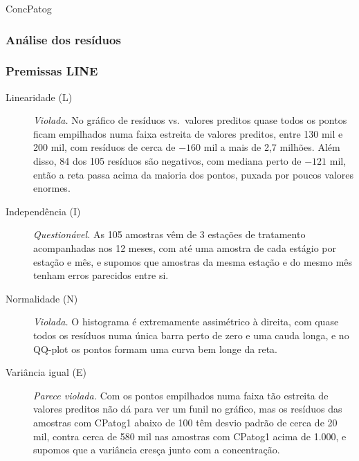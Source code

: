 \begin{dataset}{ConcPatog}

\subsubsection{Análise dos resíduos}




\subsubsection{Premissas LINE}

\begin{description}
    \item[Linearidade (L)] \textit{Violada.} No gráfico de resíduos vs.\ valores preditos quase todos os pontos ficam empilhados numa faixa estreita de valores preditos, entre 130 mil e 200 mil, com resíduos de cerca de $-160$ mil a mais de 2,7 milhões. Além disso, 84 dos 105 resíduos são negativos, com mediana perto de $-121$ mil, então a reta passa acima da maioria dos pontos, puxada por poucos valores enormes.
    \item[Independência (I)] \textit{Questionável.} As 105 amostras vêm de 3 estações de tratamento acompanhadas nos 12 meses, com até uma amostra de cada estágio por estação e mês, e supomos que amostras da mesma estação e do mesmo mês tenham erros parecidos entre si.
    \item[Normalidade (N)] \textit{Violada.} O histograma é extremamente assimétrico à direita, com quase todos os resíduos numa única barra perto de zero e uma cauda longa, e no QQ-plot os pontos formam uma curva bem longe da reta.
    \item[Variância igual (E)] \textit{Parece violada.} Com os pontos empilhados numa faixa tão estreita de valores preditos não dá para ver um funil no gráfico, mas os resíduos das amostras com CPatog1 abaixo de 100 têm desvio padrão de cerca de 20 mil, contra cerca de 580 mil nas amostras com CPatog1 acima de 1.000, e supomos que a variância cresça junto com a concentração.
\end{description}


\end{dataset}
